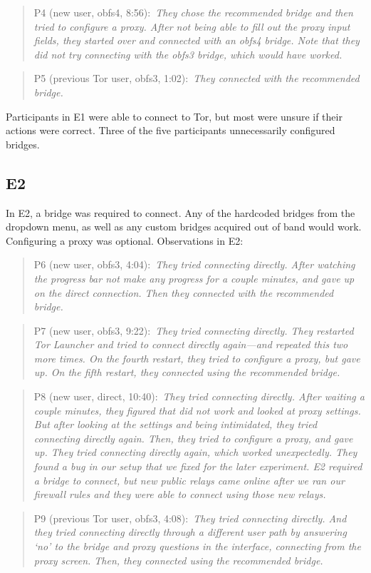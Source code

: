 \documentclass[USenglish,oneside,twocolumn]{article}
\newcommand{\pquote}[2]{
\begin{quotation}
\noindent #1:~\textit{#2}
\end{quotation}
}
\begin{document}
\pquote{P4 (new user, obfs4, 8:56)}{They chose the recommended bridge and then tried to configure a proxy. After not being able to fill out the proxy input fields, they started over and connected with an obfs4 bridge. Note that they did not try connecting with the obfs3 bridge, which would have worked.}

\pquote{P5 (previous Tor user, obfs3, 1:02)}{They connected with the recommended bridge.}

Participants in E1 were able to connect to Tor, but most were unsure if their actions were correct. Three of the five participants unnecessarily configured bridges. 

\subsection{E2} 
In E2, a bridge was required to connect. Any of the hardcoded bridges from the dropdown menu, as well as any custom bridges acquired out of band would work. Configuring a proxy was optional.
Observations in E2: 

\pquote{P6 (new user, obfs3, 4:04)}{They tried connecting directly. After watching the progress bar not make any progress for a couple minutes, and gave up on the direct connection. Then they connected with the recommended bridge.}

\pquote{P7 (new user, obfs3, 9:22)}{They tried connecting directly. They restarted Tor Launcher and tried to connect directly again---and repeated this two more times. On the fourth restart, they tried to configure a proxy, but gave up. On the fifth restart, they connected using the recommended bridge.}

\pquote{P8 (new user, direct, 10:40)}{They tried connecting directly. After waiting a couple minutes, they figured that did not work and looked at proxy settings. But after looking at the settings and being intimidated, they tried connecting directly again. Then, they tried to configure a proxy, and gave up. They tried connecting directly again, which worked unexpectedly. They found a bug in our setup that we fixed for the later experiment. E2 required a bridge to connect, but new public relays came online after we ran our firewall rules and they were able to connect using those new relays. }

\pquote{P9 (previous Tor user, obfs3, 4:08)}{They tried connecting directly. And they tried connecting directly through a different user path by answering `no' to the bridge and proxy questions in the interface, connecting from the proxy screen. Then, they connected using the recommended bridge.}
\end{document}
